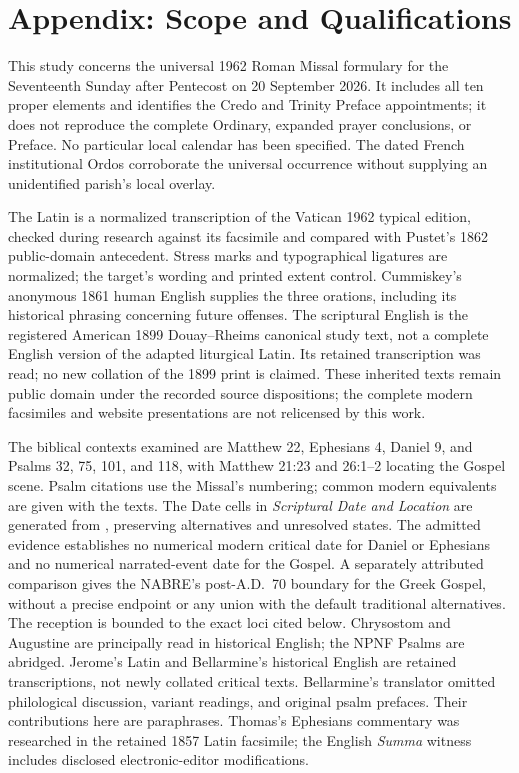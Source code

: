 \section{Appendix: Scope and Qualifications}

This study concerns the universal 1962 Roman Missal formulary for the Seventeenth Sunday after Pentecost on 20 September 2026. It includes all ten proper elements and identifies the Credo and Trinity Preface appointments; it does not reproduce the complete Ordinary, expanded prayer conclusions, or Preface. No particular local calendar has been specified. The dated French institutional Ordos corroborate the universal occurrence without supplying an unidentified parish's local overlay.

The Latin is a normalized transcription of the Vatican 1962 typical edition, checked during research against its facsimile and compared with Pustet's 1862 public-domain antecedent. Stress marks and typographical ligatures are normalized; the target's wording and printed extent control. Cummiskey's anonymous 1861 human English supplies the three orations, including its historical phrasing concerning future offenses. The scriptural English is the registered American 1899 Douay--Rheims canonical study text, not a complete English version of the adapted liturgical Latin. Its retained transcription was read; no new collation of the 1899 print is claimed. These inherited texts remain public domain under the recorded source dispositions; the complete modern facsimiles and website presentations are not relicensed by this work.

The biblical contexts examined are Matthew 22, Ephesians 4, Daniel 9, and Psalms 32, 75, 101, and 118, with Matthew 21:23 and 26:1--2 locating the Gospel scene. Psalm citations use the Missal's numbering; common modern equivalents are given with the texts. The Date cells in \textit{Scriptural Date and Location} are generated from , preserving alternatives and unresolved states. The admitted evidence establishes no numerical modern critical date for Daniel or Ephesians and no numerical narrated-event date for the Gospel. A separately attributed comparison gives the NABRE's post-A.D.~70 boundary for the Greek Gospel, without a precise endpoint or any union with the default traditional alternatives. The reception is bounded to the exact loci cited below. Chrysostom and Augustine are principally read in historical English; the NPNF Psalms are abridged. Jerome's Latin and Bellarmine's historical English are retained transcriptions, not newly collated critical texts. Bellarmine's translator omitted philological discussion, variant readings, and original psalm prefaces. Their contributions here are paraphrases. Thomas's Ephesians commentary was researched in the retained 1857 Latin facsimile; the English \textit{Summa} witness includes disclosed electronic-editor modifications.

